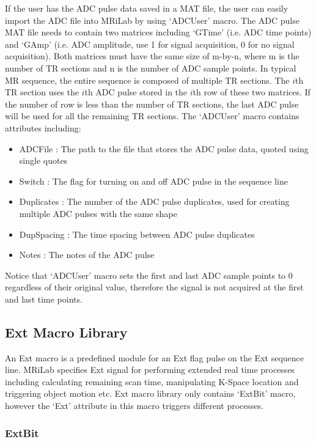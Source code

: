 \documentclass{book}%
\begin{document}
If the user has the ADC pulse data saved in a MAT file, the user can easily import the ADC file into MRiLab by using `ADCUser' macro. The ADC pulse MAT file needs to contain two matrices including `GTime' (i.e. ADC time points) and `GAmp' (i.e. ADC amplitude, use 1 for signal acquisition, 0 for no signal acquisition). Both matrices must have the same size of m-by-n, where m is the number of TR sections and n is the number of ADC sample points. In typical MR sequence, the entire sequence is composed of multiple TR sections. The $i$th TR section uses the $i$th ADC pulse stored in the $i$th row of these two matrices. If the number of row is less than the number of TR sections, the last ADC pulse will be used for all the remaining TR sections. The `ADCUser' macro contains attributes including:

\begin{itemize}
	\item ADCFile : The path to the file that stores the ADC pulse data, quoted using single quotes
	\item Switch : The flag for turning on and off ADC pulse in the sequence line
	\item Duplicates : The number of the ADC pulse duplicates, used for creating multiple ADC pulses with the same shape
	\item DupSpacing : The time spacing between ADC pulse duplicates
	\item Notes : The notes of the ADC pulse 
\end{itemize}

Notice that `ADCUser' macro sets the first and last ADC sample points to 0 regardless of their original value, therefore the signal is not acquired at the first and last time points.

\subsection{Ext Macro Library} \label{subs:ExtMacroLibrary}

An Ext macro is a predefined module for an Ext flag pulse on the Ext sequence line. MRiLab specifies Ext signal for performing extended real time processes including calculating remaining scan time, manipulating K-Space location and triggering object motion etc. Ext macro library only contains `ExtBit' macro, however the `Ext' attribute in this macro triggers different processes. 

\subsubsection{ExtBit}
\end{document}
